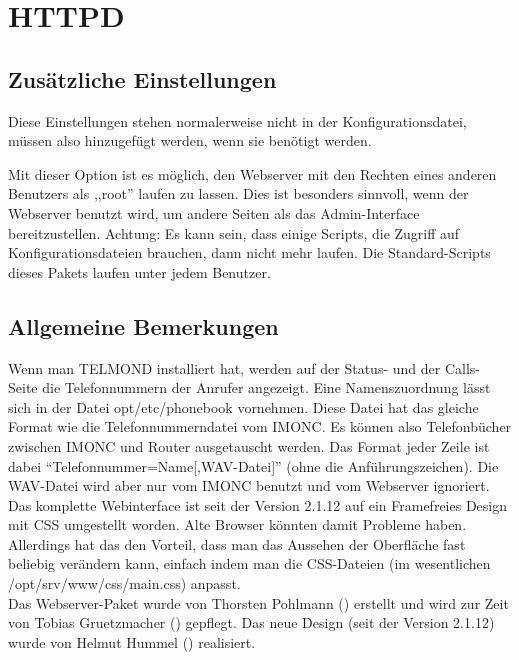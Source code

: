 \section {HTTPD}

\subsection{Zusätzliche Einstellungen}

Diese Einstellungen stehen normalerweise nicht in der Konfigurationsdatei,
müssen also hinzugefügt werden, wenn sie benötigt werden.

\begin{description}
    {Mit dieser Option ist es möglich, den Webserver mit den Rechten eines
    anderen Benutzers als ,,root'' laufen zu lassen. Dies ist besonders
    sinnvoll, wenn der Webserver benutzt wird, um andere Seiten als das
    Admin-Interface bereitzustellen. Achtung: Es kann sein, dass einige
    Scripts, die Zugriff auf Konfigurationsdateien brauchen, dann nicht mehr
    laufen. Die Standard-Scripts dieses Pakets laufen unter jedem Benutzer.}
\end{description}

\subsection{Allgemeine Bemerkungen}

    Wenn man TELMOND installiert hat, werden auf der Status- und der Calls-
    Seite die Telefonnummern der Anrufer angezeigt. Eine Namenszuordnung
    lässt sich in der Datei opt/etc/phonebook vornehmen. Diese Datei hat das
    gleiche Format wie die Telefonnummerndatei vom IMONC. Es können also
    Telefonbücher zwischen IMONC und Router ausgetauscht werden. Das Format
    jeder Zeile ist dabei ``Telefonnummer=Name[,WAV-Datei]'' (ohne die
    Anführungszeichen). Die WAV-Datei wird aber nur vom IMONC benutzt und
    vom Webserver ignoriert.\\

    Das komplette Webinterface ist seit der Version 2.1.12 auf ein Framefreies
    Design mit CSS umgestellt worden. Alte Browser könnten damit Probleme haben.
    Allerdings hat das den Vorteil, dass man das Aussehen der Oberfläche fast beliebig
    verändern kann, einfach indem man die CSS-Dateien (im wesentlichen 
    /opt/srv/www/css/main.css) anpasst.\\

    Das Webserver-Paket wurde von Thorsten Pohlmann ()
    erstellt und wird zur Zeit von Tobias Gruetzmacher ()
    gepflegt. Das neue Design (seit der Version 2.1.12) wurde von 
    Helmut Hummel () realisiert.


